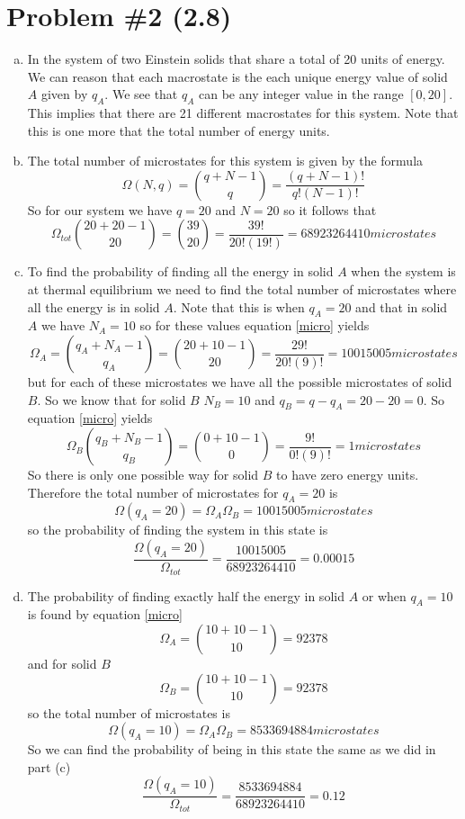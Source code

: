 \documentclass[11pt]{article}
\numberwithin{equation}{section}
\begin{document}
\section{Problem \#2 (2.8)}
\begin{enumerate}[(a)]
\item
In the system of two Einstein solids that share a total of 20 units of energy. We can reason that each macrostate is the each unique energy value of solid $A$ given by $q_A$. We see that $q_A$ can be any integer value in the range $[0,20]$. This implies that there are 21 different macrostates for this system. Note that this is one more that the total number of energy units.

\item
The total number of microstates for this system is given by the formula
\begin{equation}
\Omega(N,q) =  {q+N-1\choose q} = \frac{(q+N-1)!}{q!(N-1)!}
\label{micro}
\end{equation}
So for our system we have $q=20$ and $N=20$ so it follows that
$$\Omega_{tot}{20+20-1\choose 20}  = {39\choose 20} = \frac{39!}{20!(19!)} = 68923264410\unit{microstates}$$

\item
To find the probability of finding all the energy in solid $A$ when the system is at thermal equilibrium we need to find the total number of microstates where all the energy is in solid $A$. Note that this is when $q_A=20$ and that in solid $A$ we have $N_A = 10$ so for these values equation \ref{micro} yields
$$\Omega_A = {q_A+N_A-1\choose q_A} = {20+10-1\choose 20} = \frac{29!}{20!(9)!} = 10015005\unit{microstates}$$
but for each of these microstates we have all the possible microstates of solid $B$. So we know that for solid $B$ $N_B =10$ and $q_B = q-q_A = 20-20 = 0$. So equation \ref{micro} yields
$$\Omega_B {q_B+N_B-1\choose q_B} = {0+10-1\choose 0} = \frac{9!}{0!(9)!} = 1\unit{microstates}$$
So there is only one possible way for solid $B$ to have zero energy units. Therefore the total number of microstates for $q_A =20$ is 
$$\Omega(q_A=20) = \Omega_A\Omega_B = 10015005\unit{microstates}$$
so the probability of finding the system in this state is
$$\frac{\Omega(q_A=20)}{\Omega_{tot}} = \frac{10015005}{68923264410} = 0.00015$$

\item
The probability of finding exactly half the energy in solid $A$ or when $q_A = 10$ is found by equation \ref{micro}
$$\Omega_A = {10+10-1\choose 10} = 92378$$
and for solid $B$ 
$$\Omega_B = {10+10-1\choose 10} = 92378$$
so the total number of microstates is 
$$\Omega(q_A=10) = \Omega_A\Omega_B = 8533694884\unit{microstates}$$
So we can find the probability of being in this state the same as we did in part (c)
$$\frac{\Omega(q_A=10)}{\Omega_{tot}} = \frac{8533694884}{68923264410} = 0.12$$


\end{enumerate}
\end{document}
